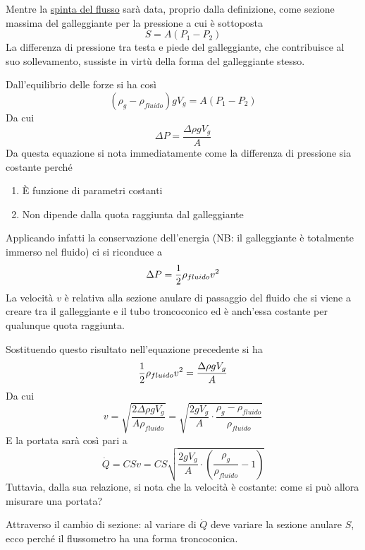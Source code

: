 \documentclass[a4paper, 15pt]{article}
\begin{document}
\begin{adjustwidth}{2in}{}
	Mentre la \underline{spinta del flusso} sarà data, proprio dalla definizione, come sezione massima del galleggiante per la pressione a cui è sottoposta
	\[S = A(P_1-P_2)\]
	La differenza di pressione tra testa e piede del galleggiante, che contribuisce al suo sollevamento, sussiste in virtù della forma del galleggiante stesso.\newline 
	
	Dall'equilibrio delle forze si ha così
	\[(\rho_g-\rho_{fluido}) g V_g = A(P_1-P_2)\]
	Da cui
	\[\Delta P = \dfrac{\Delta \rho gV_g}{A}\]
	Da questa equazione si nota immediatamente come la differenza di pressione sia
	costante perché 
	\begin{enumerate}
		\item È funzione di parametri costanti 
		\item Non dipende dalla quota raggiunta dal galleggiante
	\end{enumerate} 	
	Applicando infatti la conservazione dell'energia (NB: il galleggiante è totalmente immerso nel fluido) ci si riconduce a 
	\[\Delta P = {1\over2}\rho_{fluido}v^2\]
	La velocità $v$ è relativa alla sezione anulare di passaggio del fluido che
	si viene a creare tra il galleggiante e il tubo troncoconico ed è anch'essa costante per qualunque quota raggiunta. \newline 
	
	Sostituendo questo risultato nell'equazione precedente si ha
	\[{1\over2}\rho_{fluido}v^2 = \dfrac{\Delta \rho gV_g}{A}\]
	Da cui
	\[v = \sqrt{\dfrac{2\Delta \rho gV_g}{A\rho_{fluido}}} = \sqrt{\dfrac{2gV_g}{A}\cdot\dfrac{\rho_g-\rho_{fluido}}{\rho_{fluido}}}\]
	E la portata sarà così pari a 
	\[\dot{Q} = CSv = CS\sqrt{\dfrac{2gV_g}{A}\cdot\left(\dfrac{\rho_g}{\rho_{fluido}}-1\right)} \]
	Tuttavia, dalla sua relazione, si nota che la velocità è costante: come si può allora misurare una portata? 
	
	Attraverso il cambio di sezione: al variare di $\dot{Q}$ deve variare la sezione anulare $S$, ecco perché il flussometro ha una forma troncoconica.
\end{adjustwidth}
\end{document}
